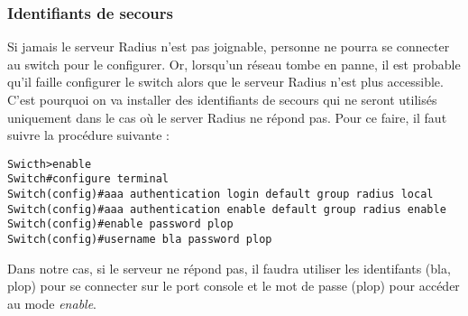 \subsubsection{Identifiants de secours}

Si jamais le serveur Radius n'est pas joignable, personne ne pourra se connecter au switch pour le configurer. Or, lorsqu'un réseau tombe en panne, il est probable qu'il faille configurer le switch alors que le serveur Radius n'est plus accessible. C'est pourquoi on va installer des identifiants de secours qui ne seront utilisés uniquement dans le cas où le server Radius ne répond pas. Pour ce faire, il faut suivre la procédure suivante :

\begin{verbatim}
Swicth>enable
Switch#configure terminal
Switch(config)#aaa authentication login default group radius local
Switch(config)#aaa authentication enable default group radius enable
Switch(config)#enable password plop
Switch(config)#username bla password plop
\end{verbatim}

Dans notre cas, si le serveur ne répond pas, il faudra utiliser les identifants (bla, plop) pour se connecter sur le port console et le mot de passe (plop) pour accéder au mode \textit{enable}.
